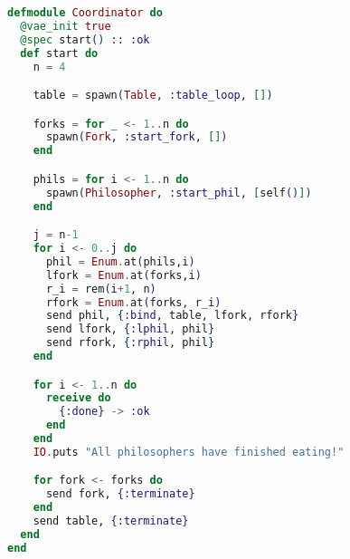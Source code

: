 \begin{lstlisting}[language=Elixir, xleftmargin=.1\linewidth]
defmodule Coordinator do
  @vae_init true
  @spec start() :: :ok
  def start do
    n = 4

    table = spawn(Table, :table_loop, [])

    forks = for _ <- 1..n do
      spawn(Fork, :start_fork, [])
    end

    phils = for i <- 1..n do
      spawn(Philosopher, :start_phil, [self()])
    end

    j = n-1
    for i <- 0..j do
      phil = Enum.at(phils,i)
      lfork = Enum.at(forks,i)
      r_i = rem(i+1, n)
      rfork = Enum.at(forks, r_i)
      send phil, {:bind, table, lfork, rfork}
      send lfork, {:lphil, phil}
      send rfork, {:rphil, phil}
    end

    for i <- 1..n do
      receive do
        {:done} -> :ok
      end
    end
    IO.puts "All philosophers have finished eating!"

    for fork <- forks do
      send fork, {:terminate}
    end
    send table, {:terminate}
  end
end

\end{lstlisting}

